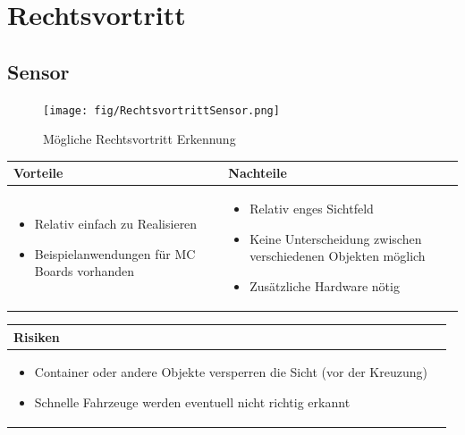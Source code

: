 
\section{Rechtsvortritt}


\subsection{Sensor}

\begin{figure}[h]
	\centering
	\texttt{[image: fig/RechtsvortrittSensor.png]}
	\caption{Mögliche Rechtsvortritt Erkennung}
\end{figure}

\begin{table}[h]
\begin{tabular}{p{} | p{}}


 \textbf{Vorteile} & \textbf{Nachteile} \\ \hline
	 
\begin{itemize}
\item Relativ einfach zu Realisieren
\item Beispielanwendungen für MC Boards vorhanden 
\end{itemize}

 
 &
 
\begin{itemize}
\item Relativ enges Sichtfeld
\item Keine Unterscheidung zwischen verschiedenen Objekten möglich
\item Zusätzliche Hardware nötig
\end{itemize}

\end{tabular}
\end{table}

\begin{table}[h]
\begin{tabular}{p{}p{}}


 \textbf{Risiken} & \\ \hline
	 
\begin{itemize}
\item Container oder andere Objekte versperren die Sicht (vor der Kreuzung)
\item Schnelle Fahrzeuge werden eventuell nicht richtig erkannt
\end{itemize}


 
\end{tabular}
\end{table}

